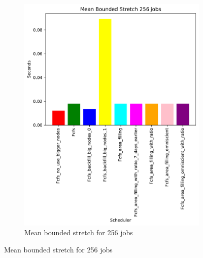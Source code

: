 \documentclass[a4paper]{article}
\begin{document}
\begin{figure}[H]
\begin{subfigure}[b]{0.4\linewidth}\centering\includegraphics[width=0.95\linewidth]{MBSS/plot/Size_Constraint_2022-01-17->2022-01-17_V85105_Mean_Stretch_With_a_Minimum_256_450_128_32_256_4_1024.pdf}\caption{Mean bounded stretch for 256 jobs}\label{45}\end{subfigure}

\end{figure}
\end{document}
